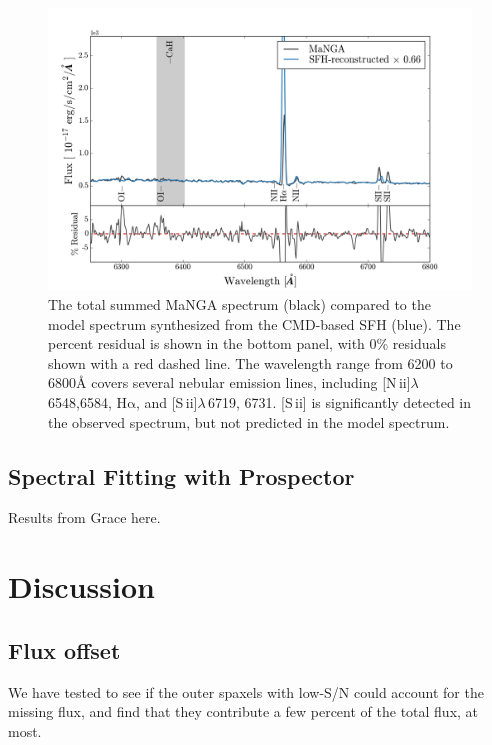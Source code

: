 \documentclass[preprint2]{aastex62}
\newcommand{\nii}{[N\,{\sc ii}]\xspace}
\newcommand{\sii}{[S\,{\sc ii}]\xspace}
\newcommand{\ha}{\ensuremath{\mathrm{H\alpha}}\xspace}
\newcommand{\ang}{\ensuremath{\mbox{\AA}}\xspace}
\begin{document}
\begin{figure}
  \begin{center}
    \includegraphics[width=\linewidth]{figs/figD.png}
    \caption{The total summed MaNGA spectrum (black) compared to the model spectrum synthesized from the CMD-based SFH (blue). The percent residual is shown in the bottom panel, with 0\% residuals shown with a red dashed line. The wavelength range from 6200 to 6800\ang covers several nebular emission lines, including \nii$\lambda$\,6548,6584, \ha, and \sii$\lambda$\,6719, 6731. \sii is significantly detected in the observed spectrum, but not predicted in the model spectrum.}
    \label{fig:zoomSpec3}
  \end{center}
\end{figure}

\subsection{Spectral Fitting with Prospector}\label{sec:results:pros}

Results from Grace here.



\section{Discussion}\label{sec:discussion}

\subsection{Flux offset}\label{sec:discussion:offset}
We have tested to see if the outer spaxels with low-S/N could account for the missing flux, and find that they contribute a few percent of the total flux, at most.
\end{document}
